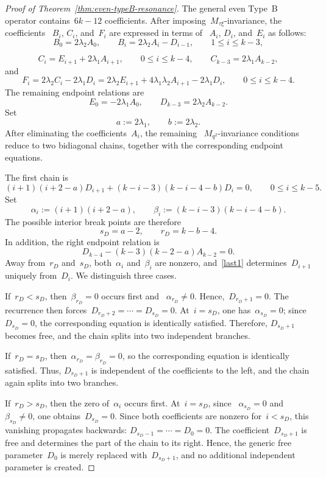 \documentclass[12pt,a4paper]{amsart}
\theoremstyle{thm}
\theoremstyle{definition}
\begin{document}
\begin{proof}[Proof of Theorem~\textup{\ref{thm:even-typeB-resonance}}]
The general even Type~B operator contains~\(6k-12\) coefficients.
After imposing~\(M_{\tau\xi}\)-invariance, the coefficients~%
\(B_i\), \(C_i\), and~\(F_i\) are expressed in terms of~%
\(A_i\), \(D_i\), and~\(E_i\) as follows:
\[
B_0=2\lambda_2A_0,
\qquad
B_i=2\lambda_2A_i-D_{i-1},
\qquad
1\leq i\leq k-3,
\]

\[
C_i=E_{i+1}+2\lambda_1A_{i+1},
\qquad
0\leq i\leq k-4,
\qquad
C_{k-3}=2\lambda_1A_{k-2},
\]
and
\[
F_i
=
2\lambda_2C_i-2\lambda_1D_i
=
2\lambda_2E_{i+1}
+
4\lambda_1\lambda_2A_{i+1}
-
2\lambda_1D_i,
\qquad
0\leq i\leq k-4.
\]
The remaining endpoint relations are
\[
E_0=-2\lambda_1A_0,
\qquad
D_{k-3}=2\lambda_2A_{k-2}.
\]
Set
\[
a:=2\lambda_1,
\qquad
b:=2\lambda_2.
\]
After eliminating the coefficients~\(A_i\), the remaining~%
\(M_{q^2}\)-invariance conditions reduce to two bidiagonal chains,
together with the corresponding endpoint equations.

The first chain is
\begin{equation}\label{last1}
(i+1)(i+2-a)D_{i+1}
+
(k-i-3)(k-i-4-b)D_i=0,
\qquad
0\leq i\leq k-5.
\end{equation}
Set
\[
\alpha_i:=(i+1)(i+2-a),
\qquad
\beta_i:=(k-i-3)(k-i-4-b).
\]
The possible interior break points are therefore
\[
s_D=a-2,
\qquad
r_D=k-b-4.
\]
In addition, the right endpoint relation is
\begin{equation}\label{Dendpoint}
D_{k-4}-(k-3)(k-2-a)A_{k-2}=0.
\end{equation}
Away from~\(r_D\) and~\(s_D\), both~\(\alpha_i\) and~\(\beta_i\) are
nonzero, and~\eqref{last1} determines~\(D_{i+1}\) uniquely from~\(D_i\). We distinguish three cases.

If~$r_D<s_D$,
then~\(\beta_{r_D}=0\) occurs first and~%
\(\alpha_{r_D}\neq0\). Hence,~$D_{r_D+1}=0$.
The recurrence then forces~$D_{r_D+2}=\cdots=D_{s_D}=0$.
At~\(i=s_D\), one has~\(\alpha_{s_D}=0\); since~\(D_{s_D}=0\),
the corresponding equation is identically satisfied. Therefore,
\(D_{s_D+1}\) becomes free, and the chain splits into two independent
branches.

If~$r_D=s_D$,
then~$\alpha_{r_D}=\beta_{r_D}=0$,
so the corresponding equation is identically satisfied. Thus,
\(D_{r_D+1}\) is independent of the coefficients to the left, and the
chain again splits into two branches.

If~$r_D>s_D$,
then the zero of~\(\alpha_i\) occurs first. At~\(i=s_D\), since~%
\(\alpha_{s_D}=0\) and~\(\beta_{s_D}\neq0\), one obtains~$D_{s_D}=0$.
Since both coefficients are nonzero for~\(i<s_D\), this vanishing
propagates backwards: $D_{s_D-1}=\cdots=D_0=0$.
The coefficient~\(D_{s_D+1}\) is free and determines the part of the
chain to its right. Hence, the generic free parameter~\(D_0\) is merely
replaced with~\(D_{s_D+1}\), and no additional independent parameter is
created.


\end{proof}
\end{document}
